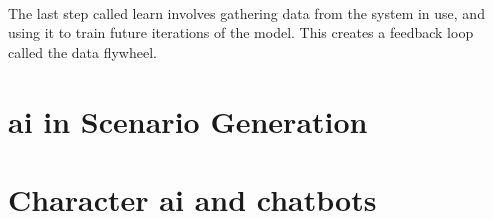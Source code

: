 \paragraph{}The last step called learn involves gathering data from the system in use, and using it to train future iterations of the model. This creates a feedback loop called the data flywheel.

\section{\acrshort{ai} in Scenario Generation}

\paragraph{}

\section{Character \acrshort{ai} and chatbots}